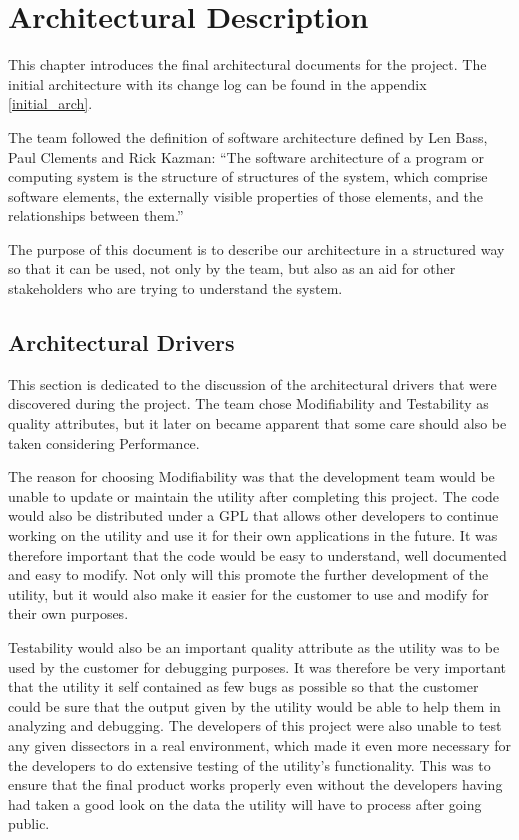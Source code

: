 \chapter{Architectural Description}
This chapter introduces the final architectural documents for the project. The initial architecture with its change log can be found in the appendix \ref{initial_arch}.

The team followed the definition of software architecture defined by Len Bass, Paul Clements and Rick Kazman: ``The software architecture of a program or computing
system is the structure of structures of the system, which comprise software elements, the externally visible properties of those elements, and the relationships between them.''~\cite[p.3]{Bass2003}

The purpose of this document is to describe our architecture in a structured way so that it can be used, not only by the team, but also as an aid for other stakeholders who are trying to understand the system.

\section{Architectural Drivers}
This section is dedicated to the discussion of the architectural drivers that were discovered during the project.
The team chose Modifiability and Testability as quality attributes, but it later on became apparent that some care should also be taken considering Performance.

The reason for choosing Modifiability was that the development team would be unable to update or maintain the \gls{utility} after completing this project. The code would also be distributed under a GPL that allows other developers to continue working on the utility and use it for their own applications in the future. It was therefore important that the code would be easy to understand, well documented and easy to modify. Not only will this promote the further development of the utility, but it would also make it easier for the customer to use and modify for their own purposes.

Testability would also be an important quality attribute as the \gls{utility} was to be used by the customer for debugging purposes. It was therefore be very important that the utility it self contained as few bugs as possible so that the customer could be sure that the output given by the utility would be able to help them in analyzing and debugging. The developers of this project were also unable to test any given \glspl{dissector} in a real environment, which made it even more necessary for the developers to do extensive testing of the utility's functionality. This was to ensure that the final product works properly even without the developers having had taken a good look on the data the utility will have to process after going public.

